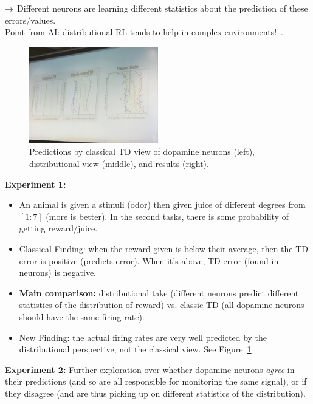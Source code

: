 $\rightarrow$ Different neurons are learning different statistics about the prediction of these errors/values. \\

Point from AI: distributional RL tends to help in complex environments!~\cite{bellemare2017distributional}. \\



\begin{figure}[h!]
    \centering
    \includegraphics[width=0.5\textwidth]{images/dist.JPG}
    \caption{Predictions by classical TD view of dopamine neurons (left), distributional view (middle), and results (right).}
    \label{fig:dist_td}
\end{figure}

{\bf Experiment 1:} 
\begin{itemize}
    \item An animal is given a stimuli (odor) then given juice of different degrees from $[1:7]$ (more is better). In the second tasks, there is some probability of getting reward/juice.
    \item Classical Finding: when the reward given is below their average, then the TD error is positive (predicts error). When it's above, TD error (found in neurons) is negative.
    
    \item {\bf Main comparison:} distributional take (different neurons predict different statistics of the distribution of reward) vs. classic TD (all dopamine neurons should have the same firing rate).
    
    \item New Finding: the actual firing rates are very well predicted by the distributional perspective, not the classical view. See Figure~\ref{fig:dist_td}
\end{itemize}


{\bf Experiment 2:} Further exploration over whether dopamine neurons {\it agree} in their predictions (and so are all responsible for monitoring the same signal), or if they disagree (and are thus picking up on different statistics of the distribution). \\


